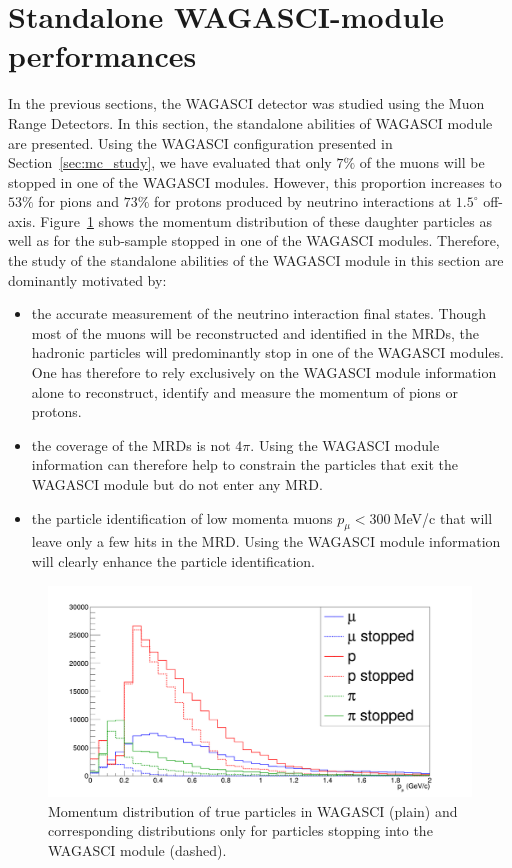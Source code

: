 \section{Standalone WAGASCI-module performances}
\label{sec:mc_study_standalone}

In the previous sections, the WAGASCI detector was studied using the Muon Range Detectors. In this section, the standalone abilities of WAGASCI module are presented. 
Using the WAGASCI configuration presented in Section~\ref{sec:mc_study}, we have evaluated that only $7\%$ of the muons will be stopped in one of the WAGASCI modules. 
However, this proportion increases to $53\%$ for pions and $73\%$ for protons produced by neutrino interactions at $1.5^{\circ}$ off-axis. 
Figure~\ref{fig:stoppedproportions} shows the momentum distribution of these daughter particles as well as for the sub-sample stopped in one of the WAGASCI modules. 
Therefore, the study of the standalone abilities of the WAGASCI module in this section are dominantly motivated by:
\begin{itemize}
\item the accurate measurement of the neutrino interaction final states. Though most of the muons will be reconstructed and identified in the MRDs, the hadronic particles will 
predominantly stop in one of the  WAGASCI modules.
One has therefore to rely exclusively on the WAGASCI module information alone to reconstruct, identify and measure the momentum of pions or protons.
\item the coverage of the MRDs is not $4\pi$. Using the WAGASCI module information can
therefore help to constrain the particles that exit the WAGASCI module
but do not  enter any MRD.
\item the particle identification of low momenta muons $p_{\mu} < 300~$MeV/c that will leave only a few hits in the MRD. Using the WAGASCI module information will clearly enhance the particle identification.
\end{itemize}

\begin{figure}
  \centering
\includegraphics[width=.7\textwidth]{fig/StoppedProportionsMomentum.pdf}
\caption{\label{fig:stoppedproportions} Momentum distribution of true particles in WAGASCI (plain) and corresponding distributions only for particles stopping into the WAGASCI module (dashed).}
\end{figure}

